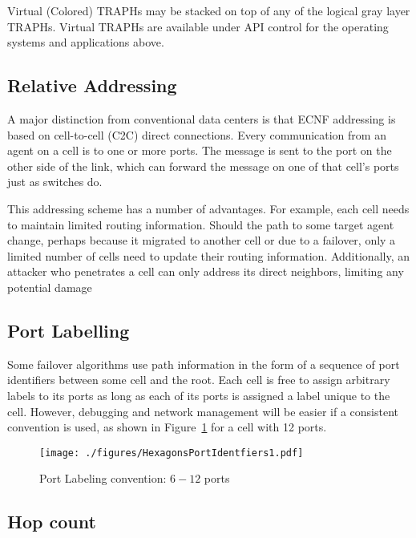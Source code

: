 \documentclass[../OAE-SPEC-MAIN.tex]{subfiles}
\begin{document}
Virtual (Colored) TRAPHs may be stacked on top of any of the logical gray layer TRAPHs.  Virtual TRAPHs are available under API control for the operating systems and applications above.



\subsection{Relative Addressing}

A major distinction from conventional data centers is that ECNF addressing is based on cell-to-cell (C2C) direct connections. Every communication from an agent on a cell is to one or more ports. The message is sent to the port on the other side of the link, which can forward the message on one of that cell's ports just as switches do. 

This addressing scheme has a number of advantages.  For example, each cell needs to maintain limited routing information.  Should the path to some target agent change, perhaps because it migrated to another cell or due to a failover, only a limited number of cells need to update their routing information.  Additionally, an attacker who penetrates a cell can only address its direct neighbors, limiting any potential damage

\subsection{Port Labelling}

Some failover algorithms use path information in the form of a sequence of port identifiers between some cell and the root.  Each cell is free to assign arbitrary labels to its ports as long as each of its ports is assigned a label unique to the cell.  However, debugging and network management will be easier if a consistent convention is used, as shown in Figure~\ref{fig:foo} for a cell with 12 ports.
 
\begin{figure}[h!]		%
\centering
	\texttt{[image: ./figures/HexagonsPortIdentfiers1.pdf]}
	\caption{Port Labeling convention: $6-12$ ports}	%
	\label{fig:foo}								%
\end{figure}
 
\subsection{Hop count}
\end{document}
